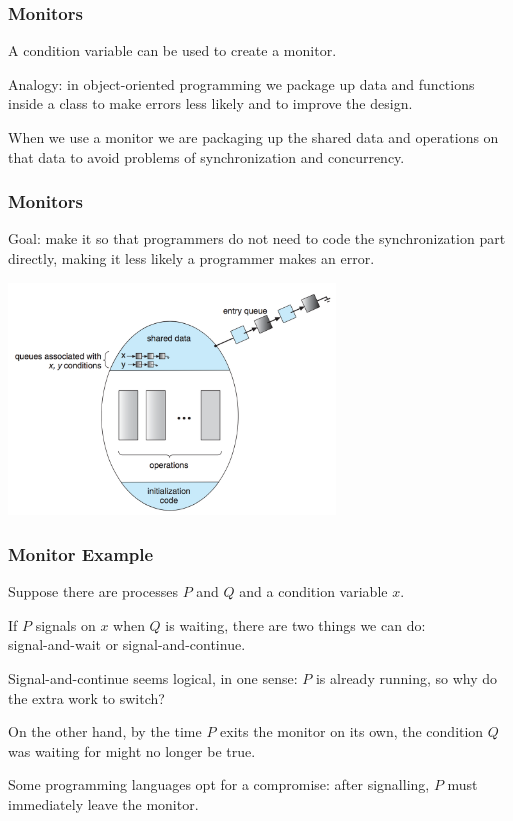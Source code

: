 \begin{frame}
\frametitle{Monitors}

A condition variable can be used to create a \alert{monitor}.

Analogy: in object-oriented programming we package up data and functions inside a class to make errors less likely and to improve the design. 

When we use a monitor we are packaging up the shared data and operations on that data to avoid problems of synchronization and concurrency.

\end{frame}

\begin{frame}
\frametitle{Monitors}

Goal: make it so that programmers do not need to code the synchronization part directly, making it less likely a programmer makes an error.

\begin{center}
\includegraphics[width=0.65\textwidth]{images/sync-monitor.png}
\end{center}

\end{frame}

\begin{frame}
\frametitle{Monitor Example}


Suppose there are processes $P$ and $Q$ and a condition variable $x$. 

If $P$ signals on $x$ when $Q$ is waiting, there are two things we can do:\\
\quad \alert{signal-and-wait} or \alert{signal-and-continue}. 

Signal-and-continue seems logical, in one sense: $P$ is already running, so why do the extra work to switch? 

On the other hand, by the time $P$ exits the monitor on its own, the condition $Q$ was waiting for might no longer be true.

Some programming languages opt for a compromise: after signalling, $P$ must immediately leave the monitor.

\end{frame}

